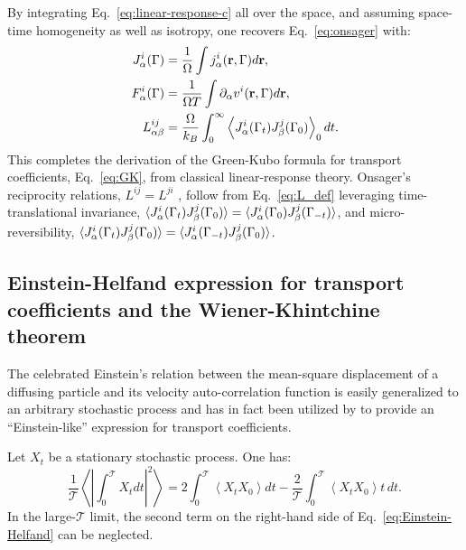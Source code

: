 By integrating Eq.~\eqref{eq:linear-response-c} all over the space, and assuming space-time homogeneity as well as isotropy, one recovers Eq.~\eqref{eq:onsager} with:
\begin{align}
J^i_\alpha(\rGamma) &= \frac{1}{\rOmega} \int j^i_\alpha(\mathbf{r},\rGamma) d\mathbf{r}, \label{eq:J_def}\\
F^i_\alpha(\rGamma) &= \frac{1}{\rOmega T} \int \partial_\alpha v^i(\mathbf{r},\rGamma) d\mathbf{r}, \label{eq:F_def}\\
L^{ij}_{\alpha\beta} &= \frac{\rOmega}{k_B} \int_0^\infty \left\langle J^i_\alpha(\rGamma_t) J^j_\beta(\rGamma_0)\right\rangle_0 dt. \label{eq:L_def}
\end{align}
This completes the derivation of the Green-Kubo formula for transport coefficients, Eq.~\eqref{eq:GK}, from classical linear-response theory. Onsager's reciprocity relations, $L^{ij}=L^{ji}$ \cite{Onsager1931a,Onsager1931b}, follow from Eq.~\eqref{eq:L_def} leveraging time-translational invariance, $\langle J^i_\alpha({\mathrm\Gamma}_t) J^j_\beta({\mathrm\Gamma}_0) \rangle = \langle J^i_\alpha({\mathrm\Gamma}_0) J^j_\beta({\mathrm\Gamma}_{-t}) \rangle$, and micro-reversibility, $\langle J^i_\alpha({\mathrm\Gamma}_t) J^j_\beta({\mathrm\Gamma}_0) \rangle = \langle J^i_\alpha({\mathrm\Gamma}_{-t}) J^j_\beta({\mathrm\Gamma}_0) \rangle$.


\subsection{Einstein-Helfand expression for transport coefficients and the Wiener-Khintchine theorem}  \label{sec:Einstein}
The celebrated Einstein's relation between the mean-square displacement of a diffusing particle and its velocity auto-correlation function is easily generalized to an arbitrary stochastic process and has in fact been utilized by \citet{Helfand1960} to provide an ``Einstein-like'' expression for transport coefficients.

Let $X_t$ be a stationary stochastic process. One has:
\begin{equation}
  \frac{1}{\mathcal{T}} \left\langle \left| \int_0^\mathcal{T} X_t dt \right|^2 \right\rangle = 2 \int_0^\mathcal{T} \left\langle X_t X_0 \right\rangle dt -\frac{2}{\mathcal{T}} \int_0^\mathcal{T} \left\langle X_t X_0 \right\rangle t \,dt. \label{eq:Einstein-Helfand}
\end{equation}
In the large-$\mathcal{T}$ limit, the second term on the right-hand side of Eq.~\eqref{eq:Einstein-Helfand} can be neglected. 

